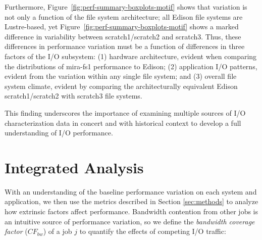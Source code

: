Furthermore, Figure~\ref{fig:perf-summary-boxplots-motif} shows that variation is not only a function of the file system architecture; all Edison file systems are Lustre-based, yet Figure~\ref{fig:perf-summary-boxplots-motif} shows a marked difference in variability between scratch1/scratch2 and scratch3.
Thus, these differences in performance variation must be a function of differences in three factors of the I/O subsystem:
(1) hardware architecture, evident when comparing the distributions of mira-fs1 performance to Edison;
(2) application I/O patterns, evident from the variation within any single file system; and
(3) overall file system climate, evident by comparing the architecturally equivalent Edison scratch1/scratch2 with scratch3 file systems.

This finding underscores the importance of examining multiple sources of I/O characterization data in concert and with historical context to develop a full understanding of I/O performance.

\section{Integrated Analysis} \label{sec:results/umami}

With an understanding of the baseline performance variation on each system and application, we then use the metrics described in Section \ref{sec:methods} to analyze how extrinsic factors affect performance.
Bandwidth contention from other jobs is an intuitive source of performance variation, so we define the \emph{bandwidth coverage factor} ($\mathit{CF}_{\mathit{bw}}$) of a job $j$ to quantify the effects of competing I/O traffic:

